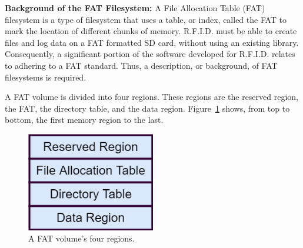 
\label{ssss:FAT_background}
\textbf{Background of the FAT Filesystem:} A File Allocation Table (FAT) filesystem is a type of filesystem that uses a table, or index, called the FAT to mark the location of different chunks of memory. R.F.I.D. must be able to create files and log data on a FAT formatted SD card, without using an existing library. Consequently, a significant portion of the software developed for R.F.I.D. relates to adhering to a FAT standard. Thus, a description, or background, of FAT filesystems is required.

 
A FAT volume is divided into four regions. These regions are the reserved region, the FAT, the directory table, and the data region. Figure~\ref{fig:FAT_regions} shows, from top to bottom, the first memory region to the last.

\begin{figure}[H]
    \centering
    \includegraphics[width=0.5\textwidth]{Figures/4_details/fat_regions.png} 
    \caption{A FAT volume's four regions.}
    \label{fig:FAT_regions}
\end{figure}

